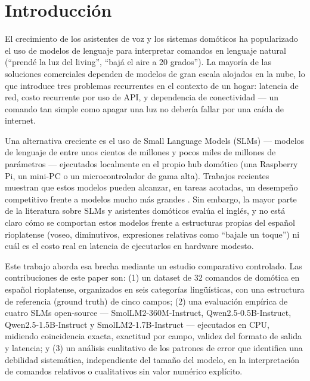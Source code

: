\section{Introducción}

El crecimiento de los asistentes de voz y los sistemas domóticos ha
popularizado el uso de modelos de lenguaje para interpretar comandos en
lenguaje natural (``prendé la luz del living'', ``bajá el aire a 20
grados''). La mayoría de las soluciones comerciales dependen de modelos de
gran escala alojados en la nube, lo que introduce tres problemas recurrentes
en el contexto de un hogar: latencia de red, costo recurrente por uso de
API, y dependencia de conectividad — un comando tan simple como apagar una
luz no debería fallar por una caída de internet.

Una alternativa creciente es el uso de Small Language Models (SLMs) —
modelos de lenguaje de entre unos cientos de millones y pocos miles de
millones de parámetros — ejecutados localmente en el propio hub domótico
(una Raspberry Pi, un mini-PC o un microcontrolador de gama alta). Trabajos
recientes muestran que estos modelos pueden alcanzar, en tareas acotadas, un
desempeño competitivo frente a modelos mucho más grandes \cite{gupta2025slms}.
Sin embargo, la mayor parte de la literatura sobre SLMs y asistentes
domóticos evalúa el inglés, y no está claro cómo se comportan estos modelos
frente a estructuras propias del español rioplatense (voseo, diminutivos,
expresiones relativas como ``bajale un toque'') ni cuál es el costo real en
latencia de ejecutarlos en hardware modesto.

Este trabajo aborda esa brecha mediante un estudio comparativo controlado.
Las contribuciones de este paper son: (1) un dataset de 32 comandos de
domótica en español rioplatense, organizados en seis categorías
lingüísticas, con una estructura de referencia (ground truth) de cinco
campos; (2) una evaluación empírica de cuatro SLMs open-source —
SmolLM2-360M-Instruct, Qwen2.5-0.5B-Instruct, Qwen2.5-1.5B-Instruct y
SmolLM2-1.7B-Instruct — ejecutados en CPU, midiendo coincidencia exacta,
exactitud por campo, validez del formato de salida y latencia; y (3) un
análisis cualitativo de los patrones de error que identifica una debilidad
sistemática, independiente del tamaño del modelo, en la interpretación de
comandos relativos o cualitativos sin valor numérico explícito.
